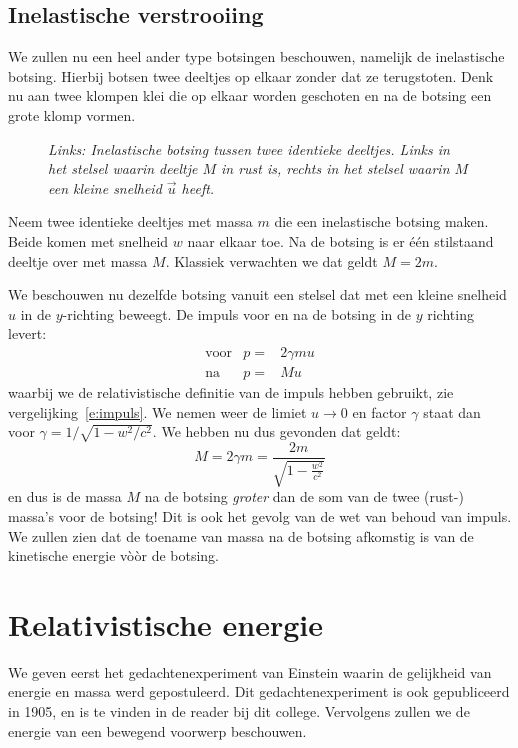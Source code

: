 \subsection{Inelastische verstrooiing}
We zullen nu een heel ander type botsingen beschouwen, namelijk de inelastische botsing. Hierbij 
botsen twee deeltjes op elkaar zonder dat ze terugstoten. Denk nu aan twee klompen klei die
op elkaar worden geschoten en na de botsing een grote klomp vormen. 

\begin{figure}[ht] 
\centering
\caption{{\sl Links: Inelastische botsing tussen twee identieke deeltjes. Links in het stelsel waarin
deeltje $M$ in rust is, rechts in het stelsel waarin $M$ een kleine snelheid $\vec{u}$ heeft. 
\label{f:bots3}}}
\end{figure}


Neem twee identieke deeltjes met massa $m$ die een inelastische botsing maken. Beide komen met snelheid $w$ naar elkaar toe. Na de botsing is er \'e\'en stilstaand deeltje over met massa $M$. Klassiek verwachten
we dat geldt $M=2m$.

We beschouwen nu dezelfde botsing vanuit een stelsel dat met een kleine snelheid $u$ in de $y$-richting beweegt. De impuls voor en na de botsing in de $y$ richting levert:
\begin{eqnarray}
\mbox{voor} & p = & 2 \gamma m u \\
\mbox{na}   & p = & M u 
\end{eqnarray}
waarbij we de relativistische definitie van de impuls hebben gebruikt, zie vergelijking~\ref{e:impuls}. We nemen weer de limiet $u\rightarrow 0$ en factor $\gamma$ staat dan voor $\gamma = 1/\sqrt{1-w^2/c^2}$.
We hebben nu dus gevonden dat geldt:
\begin{equation}
M = 2\gamma m = \frac{2m}{\sqrt{1-\frac{w^2}{c^2}}}
\end{equation}
en dus is de massa $M$ na de botsing {\it groter} dan de som van de
twee (rust-) massa's voor de botsing!  Dit is ook het gevolg van de
wet van behoud van impuls. We zullen zien dat de toename van massa na
de botsing afkomstig is van de kinetische energie v\`o\`or de botsing.
\section{Relativistische energie}
We geven eerst het gedachtenexperiment van Einstein waarin de
gelijkheid van energie en massa werd gepostuleerd.  Dit
gedachtenexperiment is ook gepubliceerd in 1905, en is te vinden in de
reader bij dit college. Vervolgens zullen we de energie van een bewegend voorwerp 
beschouwen. 
